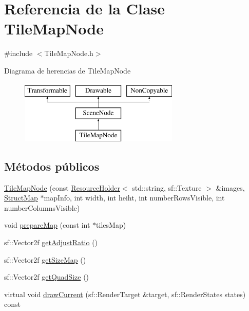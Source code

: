 \hypertarget{classTileMapNode}{}\section{Referencia de la Clase Tile\+Map\+Node}
\label{classTileMapNode}


{\ttfamily \#include $<$Tile\+Map\+Node.\+h$>$}

Diagrama de herencias de Tile\+Map\+Node\begin{figure}[H]
\begin{center}
\leavevmode
\includegraphics[height=3.000000cm]{classTileMapNode}
\end{center}
\end{figure}
\subsection*{Métodos públicos}
\begin{DoxyCompactItemize}
\item 
\hyperlink{classTileMapNode_a16e53592cfd243c14df0846539368d53}{Tile\+Map\+Node} (const \hyperlink{classResourceHolder}{Resource\+Holder}$<$ std\+::string, sf\+::\+Texture $>$ \&images, \hyperlink{structStructMap}{Struct\+Map} $\ast$map\+Info, int width, int heiht, int number\+Rows\+Visible, int number\+Columns\+Visible)
\item 
void \hyperlink{classTileMapNode_a8a2a414779f90de876e913ad172978df}{prepare\+Map} (const int $\ast$tiles\+Map)
\item 
sf\+::\+Vector2f \hyperlink{classTileMapNode_a846a4095195dc673033107c71b48e9df}{get\+Adjust\+Ratio} ()
\item 
sf\+::\+Vector2f \hyperlink{classTileMapNode_ad30b875e6c8c59efb170a67d002aaac4}{get\+Size\+Map} ()
\item 
sf\+::\+Vector2f \hyperlink{classTileMapNode_adb1c6c943363a024f3eb5b79b5e86525}{get\+Quad\+Size} ()
\item 
virtual void \hyperlink{classTileMapNode_acddf8fbc538f4952eb5ef84a211490b6}{draw\+Current} (sf\+::\+Render\+Target \&target, sf\+::\+Render\+States states) const 
\end{DoxyCompactItemize}
